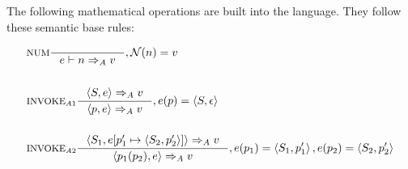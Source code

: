 
The following mathematical operations are built into the language. They follow these semantic base rules:

\begin{align*}
&\inference[NUM]{}
                  {e \vdash n \Rightarrow_A v}
                  {, \mathcal{N}(n) = v}
\\\\
&\inference[$\text{INVOKE}_{A1}$]{\Braket{S,e} \Rightarrow_A v}
                  {\Braket{p,e} \Rightarrow_A v}
                  {,e(p) = \Braket{S,\epsilon}}
\\\\
&\inference[$\text{INVOKE}_{A2}$]{\Braket{S_1,e[p_1' \mapsto \Braket{S_2,p_2'}]} \Rightarrow_A v}
                  {\Braket{p_1(p_2),e} \Rightarrow_A v}
                  {,e(p_1) = \Braket{S_1,p_1'}, e(p_2) = \Braket{S_2,p_2'}}
\\\\
\end{align*}

